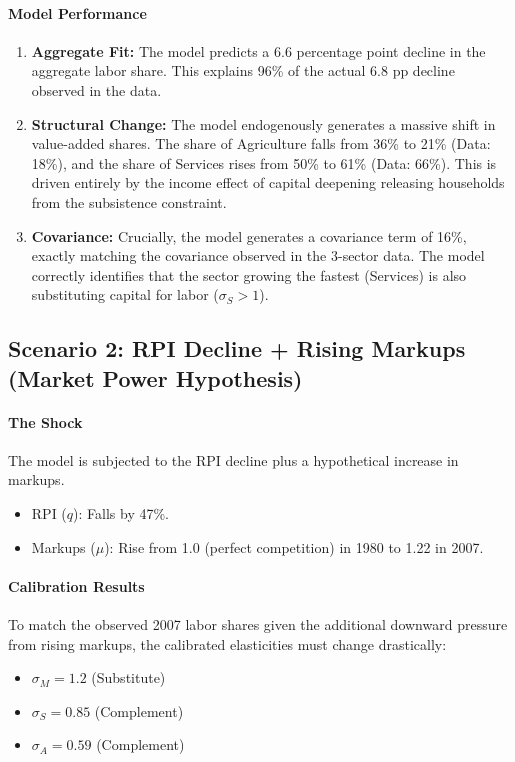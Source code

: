 \documentclass[12pt]{article}
\begin{document}
\paragraph{Model Performance}
\begin{enumerate}[leftmargin=*,itemsep=4pt]
\item \textbf{Aggregate Fit:} The model predicts a 6.6 percentage point decline in the aggregate labor share. This explains 96\% of the actual 6.8 pp decline observed in the data.
\item \textbf{Structural Change:} The model endogenously generates a massive shift in value-added shares. The share of Agriculture falls from 36\% to 21\% (Data: 18\%), and the share of Services rises from 50\% to 61\% (Data: 66\%). This is driven entirely by the income effect of capital deepening releasing households from the subsistence constraint.
\item \textbf{Covariance:} Crucially, the model generates a covariance term of 16\%, exactly matching the covariance observed in the 3-sector data. The model correctly identifies that the sector growing the fastest (Services) is also substituting capital for labor ($\sigma_S > 1$).
\end{enumerate}
\newpage
\subsection{Scenario 2: RPI Decline + Rising Markups (Market Power Hypothesis)}
\paragraph{The Shock}
The model is subjected to the RPI decline plus a hypothetical increase in markups.
\begin{itemize}[leftmargin=*,itemsep=4pt]
\item RPI ($q$): Falls by 47\%.
\item Markups ($\mu$): Rise from 1.0 (perfect competition) in 1980 to 1.22 in 2007.
\end{itemize}

\paragraph{Calibration Results}
To match the observed 2007 labor shares given the additional downward pressure from rising markups, the calibrated elasticities must change drastically:
\begin{itemize}[leftmargin=*,itemsep=4pt]
\item $\sigma_M = 1.2$ (Substitute)
\item $\sigma_S = 0.85$ (Complement)
\item $\sigma_A = 0.59$ (Complement)
\end{itemize}
\end{document}
